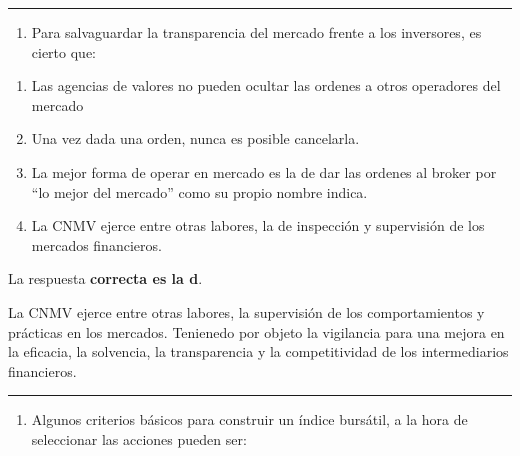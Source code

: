 \documentclass[
  letterpaper,
  DIV=11,
  numbers=noendperiod]{scrreprt}
\providecommand{\tightlist}{%
  \setlength{\itemsep}{0pt}\setlength{\parskip}{0pt}}\usepackage{longtable,booktabs,array}
\begin{document}
\begin{center}\rule{0.5\linewidth}{0.5pt}\end{center}

\begin{enumerate}
\def\labelenumi{\arabic{enumi}.}
\setcounter{enumi}{7}
\tightlist
\item
  Para salvaguardar la transparencia del mercado frente a los
  inversores, es cierto que:
\end{enumerate}

\begin{enumerate}
\def\labelenumi{\alph{enumi})}
\item
  Las agencias de valores no pueden ocultar las ordenes a otros
  operadores del mercado
\item
  Una vez dada una orden, nunca es posible cancelarla.
\item
  La mejor forma de operar en mercado es la de dar las ordenes al broker
  por ``lo mejor del mercado'' como su propio nombre indica.
\item
  La CNMV ejerce entre otras labores, la de inspección y supervisión de
  los mercados financieros.
\end{enumerate}

\begin{tcolorbox}[enhanced jigsaw, left=2mm, opacityback=0, colback=white, breakable, arc=.35mm, bottomrule=.15mm, rightrule=.15mm, toprule=.15mm, leftrule=.75mm, colframe=quarto-callout-tip-color-frame]
\begin{minipage}[t]{5.5mm}
\textcolor{quarto-callout-tip-color}{\faLightbulb}
\end{minipage}%
\begin{minipage}[t]{\textwidth - 5.5mm}

La respuesta \textbf{correcta es la d}.

La CNMV ejerce entre otras labores, la supervisión de los
comportamientos y prácticas en los mercados. Tenienedo por objeto la
vigilancia para una mejora en la eficacia, la solvencia, la
transparencia y la competitividad de los intermediarios financieros.

\end{minipage}%
\end{tcolorbox}

\begin{center}\rule{0.5\linewidth}{0.5pt}\end{center}

\begin{enumerate}
\def\labelenumi{\arabic{enumi}.}
\setcounter{enumi}{8}
\tightlist
\item
  Algunos criterios básicos para construir un índice bursátil, a la hora
  de seleccionar las acciones pueden ser:
\end{enumerate}
\end{document}
